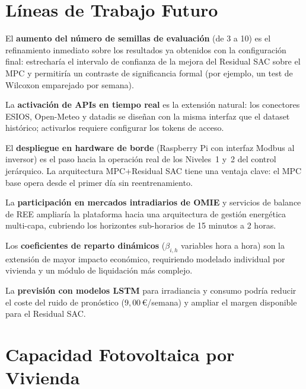 \documentclass[12pt, a4paper, twoside]{report}
\begin{document}
\chapter{Líneas de Trabajo Futuro}
\label{chap:futuro}

El \textbf{aumento del número de semillas de evaluación} (de 3 a 10) es el
refinamiento inmediato sobre los resultados ya obtenidos con la configuración
final: estrecharía el intervalo de confianza de la mejora del Residual SAC sobre
el MPC y permitiría un contraste de significancia formal (por ejemplo, un test
de Wilcoxon emparejado por semana).

La \textbf{activación de APIs en tiempo real} es la extensión natural: los
conectores ESIOS, Open-Meteo y datadis se diseñan con la misma interfaz que el
dataset histórico; activarlos requiere configurar los tokens de acceso.

El \textbf{despliegue en hardware de borde} (Raspberry Pi con interfaz Modbus
al inversor) es el paso hacia la operación real de los Niveles~1 y~2 del
control jerárquico. La arquitectura MPC+Residual SAC tiene una ventaja clave:
el MPC base opera desde el primer día sin reentrenamiento.

La \textbf{participación en mercados intradiarios de OMIE} y servicios de
balance de REE ampliaría la plataforma hacia una arquitectura de gestión
energética multi-capa, cubriendo los horizontes sub-horarios de 15 minutos a
2 horas.

Los \textbf{coeficientes de reparto dinámicos} ($\beta_{i,h}$ variables hora
a hora) son la extensión de mayor impacto económico, requiriendo modelado
individual por vivienda y un módulo de liquidación más complejo.

La \textbf{previsión con modelos LSTM} para irradiancia y consumo podría
reducir el coste del ruido de pronóstico ($9{,}00$\,€/semana) y ampliar el
margen disponible para el Residual SAC.



\appendix

\chapter{Capacidad Fotovoltaica por Vivienda}
\label{app:capacidad}
\end{document}
